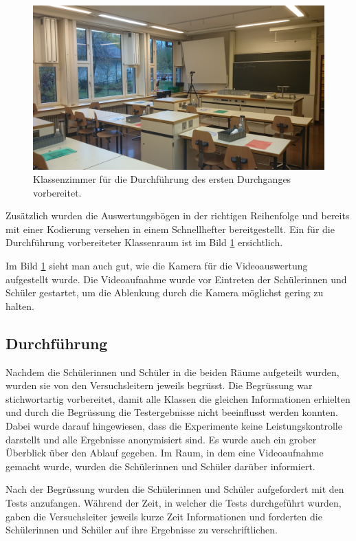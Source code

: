 \begin{figure}[htb]
\centering
\includegraphics[width=0.98\linewidth]{graphics/Durchfuerhung}
\caption[Vorbereitetes Klassenzimmer.]{Klassenzimmer für die Durchführung des ersten Durchganges vorbereitet.}
\label{fig:Durchfuerhung}
\end{figure}

Zusätzlich wurden die Auswertungsbögen in der richtigen Reihenfolge und bereits mit einer Kodierung versehen in einem Schnellhefter bereitgestellt. Ein für die Durchführung vorbereiteter Klassenraum ist im Bild \ref{fig:Durchfuerhung} ersichtlich.

Im Bild \ref{fig:Durchfuerhung} sieht man auch gut, wie die Kamera für die Videoauswertung aufgestellt wurde. Die Videoaufnahme wurde vor Eintreten der Schülerinnen und Schüler gestartet, um die Ablenkung durch die Kamera möglichst gering zu halten.

\subsection{Durchführung}
Nachdem die Schülerinnen und Schüler in die beiden Räume aufgeteilt wurden, wurden sie von den Versuchsleitern jeweils begrüsst. Die Begrüssung war stichwortartig vorbereitet, damit alle Klassen die gleichen Informationen erhielten und durch die Begrüssung die Testergebnisse nicht beeinflusst werden konnten. Dabei wurde darauf hingewiesen, dass die Experimente keine Leistungskontrolle darstellt und alle Ergebnisse anonymisiert sind. Es wurde auch ein grober Überblick über den Ablauf gegeben. Im Raum, in dem eine Videoaufnahme gemacht wurde, wurden die Schülerinnen und Schüler darüber informiert. 

Nach der Begrüssung wurden die Schülerinnen und Schüler aufgefordert mit den Tests anzufangen. Während der Zeit, in welcher die Tests durchgeführt wurden, gaben die Versuchsleiter jeweils kurze Zeit Informationen und forderten die Schülerinnen und Schüler auf ihre Ergebnisse zu verschriftlichen.

